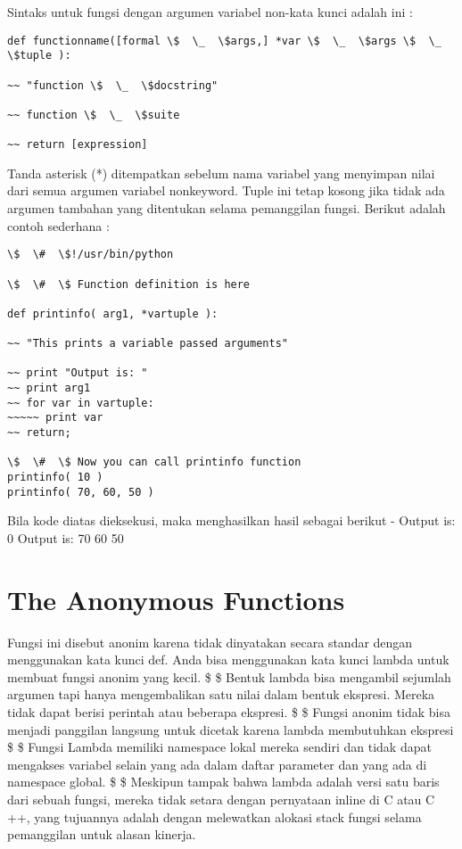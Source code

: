 Sintaks untuk fungsi dengan argumen variabel non-kata kunci adalah ini :
\begin{verbatim}
def functionname([formal \$  \_  \$args,] *var \$  \_  \$args \$  \_  \$tuple ): 

~~ "function \$  \_  \$docstring" 

~~ function \$  \_  \$suite 

~~ return [expression]
\end{verbatim}
Tanda asterisk (*) ditempatkan sebelum nama variabel yang menyimpan nilai dari semua argumen variabel nonkeyword. Tuple ini tetap kosong jika tidak ada argumen tambahan yang ditentukan selama pemanggilan fungsi. Berikut adalah contoh sederhana : 
\begin{verbatim}
\$  \#  \$!/usr/bin/python 

\$  \#  \$ Function definition is here 

def printinfo( arg1, *vartuple ): 

~~ "This prints a variable passed arguments" 

~~ print "Output is: " 
~~ print arg1
~~ for var in vartuple:
~~~~~ print var 
~~ return; 

\$  \#  \$ Now you can call printinfo function
printinfo( 10 ) 
printinfo( 70, 60, 50 ) 
\end{verbatim}
Bila kode diatas dieksekusi, maka menghasilkan hasil sebagai berikut - 
Output is: 
0
Output is: 
70 
60 
50 
\section{The Anonymous Functions} 
Fungsi ini disebut anonim karena tidak dinyatakan secara standar dengan menggunakan kata kunci def. Anda bisa menggunakan kata kunci lambda untuk membuat fungsi anonim yang kecil. 
\$ \bullet \$ Bentuk lambda bisa mengambil sejumlah argumen tapi hanya mengembalikan satu nilai dalam bentuk ekspresi. Mereka tidak dapat berisi perintah atau beberapa ekspresi. 
   \$ \bullet \$ Fungsi anonim tidak bisa menjadi panggilan langsung untuk dicetak karena lambda membutuhkan ekspresi 
   \$ \bullet \$ Fungsi Lambda memiliki namespace lokal mereka sendiri dan tidak dapat mengakses variabel selain yang ada dalam daftar parameter dan yang ada di namespace global. 
   \$ \bullet \$ Meskipun tampak bahwa lambda adalah versi satu baris dari sebuah fungsi, mereka tidak setara dengan pernyataan inline di C atau C ++, yang tujuannya adalah dengan melewatkan alokasi stack fungsi selama pemanggilan untuk alasan kinerja. 

